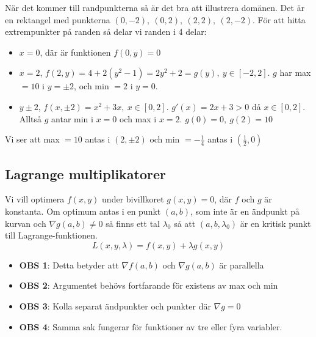 \documentclass{report}
\begin{document}
\noindent
När det kommer till randpunkterna så är det bra att illustrera domänen. Det är en rektangel med punkterna $ (0,-2), \: (0, 2), \: (2,2), \: (2,-2) $. För att hitta extrempunkter på randen så delar vi randen i 4 delar:
\begin{itemize}
	\item $ x = 0 $, där är funktionen $ f(0,y) = 0 $
	\item $ x = 2 $, $ f(2,y) = 4 + 2(y^2-1) = 2y^2 + 2= g(y), \: y \in [-2,2]$. $ g $ har max $ = 10 $  i $ y = \pm 2 $, och min $ = 2 $ i $ y = 0 $.
	\item $ y \pm 2 $, $ f(x, \pm 2) = x^2+3x, \: x \in [0,2]$. $ g'(x) = 2x+ 3 > 0 $ då $ x \in [0,2] $. Alltså $ g $ antar min i $ x =0 $ och max i $ x =2 $. $ g(0) = 0, \: g(2) = 10 $ 
\end{itemize}
Vi ser att max $ = 10 $ antas i $ (2, \pm 2) $ och min $ = - \frac{1}{4}  $ antas i $ ( \frac{1}{2}, 0) $ 

\subsection{Lagrange multiplikatorer}

{
Vi vill optimera $ f(x,y) $ under bivillkoret $ g(x,y) = 0 $, där $ f $ och $ g $ är konstanta. Om optimum antas i en punkt $ (a,b) $, som inte är en ändpunkt på kurvan och $ \nabla g(a,b) \ne 0 $ så finns ett tal $ \lambda_0 $ så att $ (a,b, \lambda_0) $ är en kritisk punkt till Lagrange-funktionen.
\begin{equation*}
L(x,y, \lambda) = f(x,y) + \lambda g(x,y)
\end{equation*}

\begin{itemize}
	\item \textbf{OBS 1}: Detta betyder att $ \nabla f(a,b) $ och $ \nabla g(a,b) $ är parallella
	\item \textbf{OBS 2}: Argumentet behövs fortfarande för existens av max och min
	\item \textbf{OBS 3}: Kolla separat ändpunkter och punkter där $ \nabla g = 0 $
	\item \textbf{OBS 4}: Samma sak fungerar för funktioner av tre eller fyra variabler.
\end{itemize}
}
\end{document}
